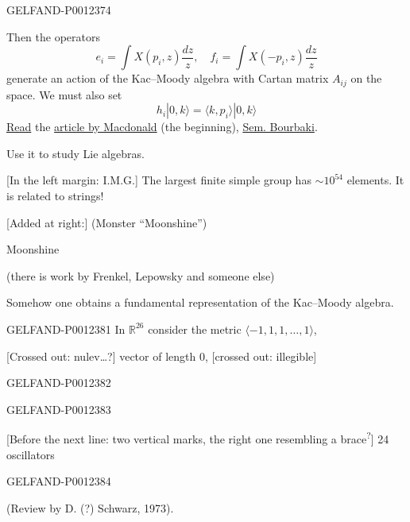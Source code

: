 \begin{GelfandAdjacentEvidence}{GELFAND-P001237}{4}


\end{GelfandAdjacentEvidence}


Then the operators
\begin{equation*}
e_i=\int X(p_i,z)\frac{dz}{z},\quad f_i=\int X(-p_i,z)\frac{dz}{z}
\tag{12}
\end{equation*}
generate an action of the Kac–Moody algebra with Cartan matrix $A_{ij}$ on the space. We must also set
\begin{equation*}
h_i|0,k\rangle=\langle k,p_i\rangle|0,k\rangle
\tag{13}
\end{equation*}
\underline{Read} the \underline{article by Macdonald} (the beginning), \underline{Sem. Bourbaki}.

Use it to study Lie algebras.

[In the left margin: I.M.G.] The largest finite simple group has $\sim10^{54}$ elements. It is related to strings!

[Added at right:] (Monster “Moonshine”)

Moonshine

(there is work by Frenkel, Lepowsky and someone else)

Somehow one obtains a fundamental representation of the Kac–Moody algebra.


\begin{GelfandAdjacentEvidence}{GELFAND-P001238}{1}
In $\mathbb R^{26}$ consider the metric $\langle-1,1,1,\ldots,1\rangle$,

[Crossed out: nulev…?] vector of length 0, [crossed out: illegible]
\end{GelfandAdjacentEvidence}
\begin{GelfandAdjacentEvidence}{GELFAND-P001238}{2}

\end{GelfandAdjacentEvidence}
\begin{GelfandAdjacentEvidence}{GELFAND-P001238}{3}


[Before the next line: two vertical marks, the right one resembling a brace\textsuperscript{?}] 24 oscillators
\end{GelfandAdjacentEvidence}
\begin{GelfandAdjacentEvidence}{GELFAND-P001238}{4}


(Review by D. (?) Schwarz, 1973).
\end{GelfandAdjacentEvidence}



